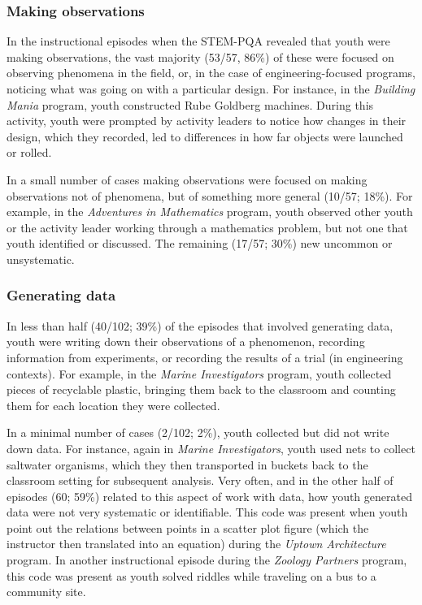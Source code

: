 \documentclass[]{msu-thesis}
\theoremstyle{definition}
\theoremstyle{definition}
\theoremstyle{definition}
\theoremstyle{remark}
\begin{document}
\subsubsection{Making observations}\label{making-observations}

In the instructional episodes when the STEM-PQA revealed that youth were
making observations, the vast majority (53/57, 86\%) of these were
focused on observing phenomena in the field, or, in the case of
engineering-focused programs, noticing what was going on with a
particular design. For instance, in the \emph{Building Mania} program,
youth constructed Rube Goldberg machines. During this activity, youth
were prompted by activity leaders to notice how changes in their design,
which they recorded, led to differences in how far objects were launched
or rolled.

In a small number of cases making observations were focused on making
observations not of phenomena, but of something more general (10/57;
18\%). For example, in the \emph{Adventures in Mathematics} program,
youth observed other youth or the activity leader working through a
mathematics problem, but not one that youth identified or discussed. The
remaining (17/57; 30\%) new uncommon or unsystematic.

\subsubsection{Generating data}\label{generating-data}

In less than half (40/102; 39\%) of the episodes that involved
generating data, youth were writing down their observations of a
phenomenon, recording information from experiments, or recording the
results of a trial (in engineering contexts). For example, in the
\emph{Marine Investigators} program, youth collected pieces of
recyclable plastic, bringing them back to the classroom and counting
them for each location they were collected.

In a minimal number of cases (2/102; 2\%), youth collected but did not
write down data. For instance, again in \emph{Marine Investigators},
youth used nets to collect saltwater organisms, which they then
transported in buckets back to the classroom setting for subsequent
analysis. Very often, and in the other half of episodes (60; 59\%)
related to this aspect of work with data, how youth generated data were
not very systematic or identifiable. This code was present when youth
point out the relations between points in a scatter plot figure (which
the instructor then translated into an equation) during the \emph{Uptown
Architecture} program. In another instructional episode during the
\emph{Zoology Partners} program, this code was present as youth solved
riddles while traveling on a bus to a community site.
\end{document}
